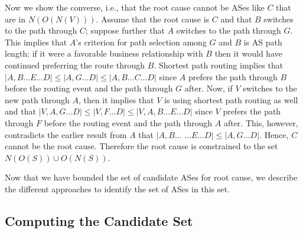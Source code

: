 Now we show 
the converse, i.e., that the root cause cannot be ASes like $C$ that are in $N(O(N(V)))$.
Assume that
the root cause is $C$ and that $B$ switches to the path through $C$;
suppose further that
$A$ switches to the path through $G$. This implies that $A$'s criterion for path selection
among $G$ and $B$ is AS path length; if it were a favorable business relationship with $B$ then it would have
continued preferring the route through $B$. Shortest path routing implies that
$|A,B\ldots{}E\ldots{}D| \leq |A,G\ldots{}D| \leq |A,B\ldots{}C\dots{}D|$
since $A$ prefers the path through $B$ before the routing event and the
path through $G$ after.
Now, if $V$ switches to the new path through $A$, then
it implies that $V$ is using shortest path routing as well and that
$|V,A,G\dots{}D| \leq |V,F\ldots{}D| \leq |V,A,B\ldots{}E\ldots{}D|$
since $V$ prefers the path through $F$ before the routing event and the
path through $A$ after.
This, however, contradicts the earlier result from $A$
that $|A,B\ldots{}$ $\ldots{}E\ldots{}D| \leq |A,G\ldots{}D|$. Hence, $C$ cannot be
the root cause.  Therefore the root cause is constrained to the set $N(O(S)) \cup O(N(S))$.

Now that we have bounded the set of candidate ASes for root cause, we describe
the different approaches to identify the set of ASes in this set.

\subsection{Computing the Candidate Set}
\label{sec:paths}

